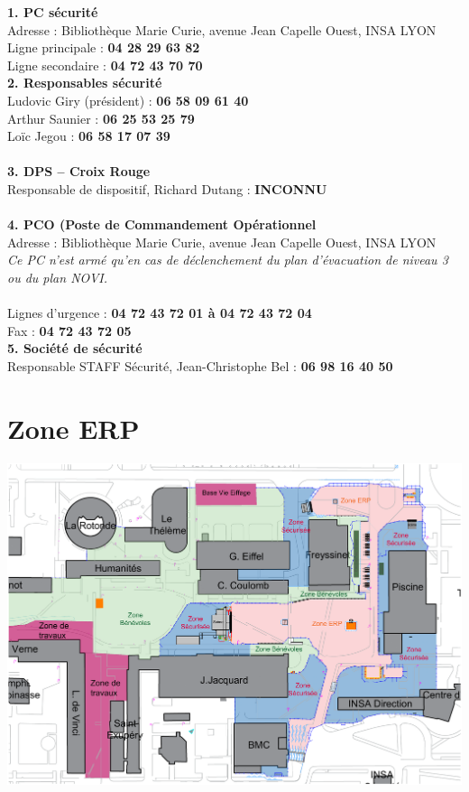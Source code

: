 \documentclass[hidelinks, paper=a4, fontsize=13pt]{report}
\begin{document}
\textbf{1. PC sécurité}\\
Adresse : Bibliothèque Marie Curie, avenue Jean Capelle Ouest, INSA LYON\\
Ligne principale : \textbf{04 28 29 63 82}\\
Ligne secondaire : \textbf{04 72 43 70 70}\\

\textbf{2. Responsables sécurité}\\
Ludovic Giry (président) : \textbf{06 58 09 61 40}\\
Arthur Saunier : \textbf{06 25 53 25 79}\\
Loïc Jegou : \textbf{06 58 17 07 39}\\
\\

\textbf{3. DPS – Croix Rouge}\\
Responsable de dispositif, Richard Dutang : \textbf{INCONNU}\\\\

\textbf{4. PCO (Poste de Commandement Opérationnel}\\
Adresse : Bibliothèque Marie Curie, avenue Jean Capelle Ouest, INSA LYON\\
\textit{Ce PC n’est armé qu'en cas de déclenchement du plan d'évacuation de niveau 3 ou du plan NOVI.\\\\
}Lignes d’urgence : 			\textbf{04 72 43 72 01   à 	04 72 43 72 04}\\
Fax : 					\textbf{04 72 43 72 05}\\

\textbf{5. Société de sécurité}\\
Responsable STAFF Sécurité, Jean-Christophe Bel : \textbf{06 98 16 40 50}\\


\section{Zone ERP}
	
	\begin{center}\includegraphics[width=.95\textheight,angle=90]{Exports/Plan_24h_45eme-Plan_ERP}\end{center}
	
\end{document}
